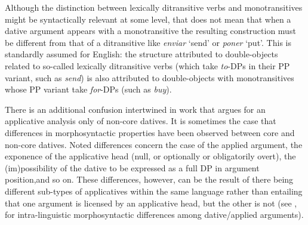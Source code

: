 \documentclass[output=paper,colorlinks,citecolor=brown,modfonts,nonflat]{langsci/langscibook}
\begin{document}
Although the distinction between lexically ditransitive verbs and monotransitives might be syntactically relevant at some level, that does not mean that when a dative argument appears with a monotransitive the resulting construction must be different from that of a ditransitive like \textit{enviar} ‘send’ or \textit{poner} ‘put’.  This is standardly assumed for English: the structure attributed to double-objects related to so-called lexically ditransitive verbs (which take \textit{to}-DPs in their PP variant, such as \textit{send}) is also attributed to double-objects with monotransitives whose PP variant take \textit{for}-DPs (such as \textit{buy}).

There is an additional confusion intertwined in work that argues for an applicative analysis only of non-core datives. It is sometimes the case that differences in morphosyntactic properties have been observed between core and non-core datives. Noted differences concern the case of the applied argument, the exponence of the applicative head (null, or optionally or obligatorily overt), the (im)possibility of the dative to be expressed as a full DP in argument position,and so on. These differences, however, can be the result of there being different sub-types of applicatives within the same language rather than entailing that one argument is licensed by an applicative head, but the other is not (see \citealt{BonehNash2012, Cuervo2003,Cuervo2015Syntax,Diaconescu2004, Pineda2016,Pineda2020, RobergeTroberg2009}, for intra-linguistic morphosyntactic differences among dative/applied arguments).
\end{document}
